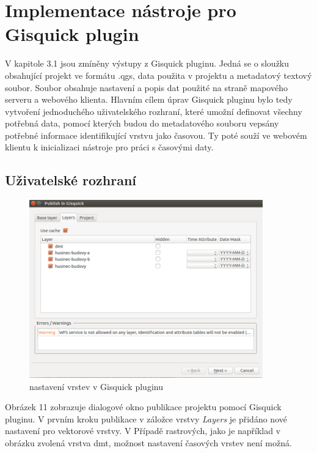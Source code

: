 \newpage
\section{Implementace nástroje pro Gisquick plugin}


V kapitole 3.1 jsou zmíněny výstupy z Gisquick pluginu. Jedná se o
sloužku obsahující projekt ve formátu .qgs, data použita v projektu a
metadatový textový soubor. Soubor obsahuje nastavení a popis dat
použité na straně mapového serveru a webového klienta. Hlavním cílem
úprav Gisquick pluginu bylo tedy vytvoření jednoduchého uživatelského
rozhraní, které umožní definovat všechny potřebná data, pomocí kterých
budou do metadatového souboru vepsány potřebné informace
identifikující vrstvu jako časovou. Ty poté souží ve webovém klientu k
inicializaci nástroje pro práci s časovými daty.

\subsection{Uživatelské rozhraní}

\begin{figure}[h!]
	\centering \includegraphics[width=0.9\textwidth]{../img/gisquick-plugin.png} \caption{nastavení
	vrstev v Gisquick pluginu} \label{fig:arcgis-time-settings}
\end{figure}

Obrázek 11 zobrazuje dialogové okno publikace projektu pomocí Gisquick
pluginu. V prvním kroku publikace v záložce vrstvy \textit{Layers} je
přidáno nové nastavení pro vektorové vrstvy. V Případě rastrových,
jako je například v obrázku zvolená vrstva dmt, možnost nastavení
časových vrstev není možná.

